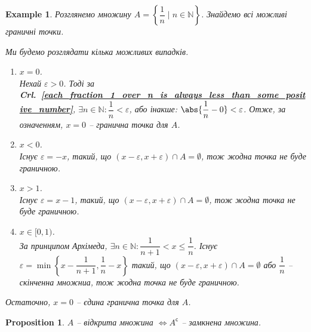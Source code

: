 \documentclass[a4paper, 14pt]{article}
\theoremstyle{theoremdd}
\theoremstyle{theoremdd}
\theoremstyle{theoremdd}
\theoremstyle{theoremdd}
\newtheorem{example}[theorem]{Example}
\theoremstyle{theoremdd}
\newtheorem{proposition}[theorem]{Proposition}
\theoremstyle{theoremdd}
\theoremstyle{theoremdd}
\theoremstyle{theoremdd}
\newcommand\crlref[1]{\textbf{Crl.~\ref{#1}}}
\begin{document}
\begin{example}
Розглянемо множину $A = \left\{ \dfrac{1}{n} \mid n \in \mathbb{N} \right\}$. Знайдемо всі можливі граничні точки.
\begin{figure}[H]
\centering
{}
\end{figure}
Ми будемо розглядати кілька можливих випадків.
\begin{enumerate}[wide=0pt,label={\Roman*.}]
\item $x = 0$.\\
Нехай $\varepsilon > 0$. Тоді за \crlref{each_fraction_1_over_n_is_always_less_than_some_positive_number}, $\exists n \in \mathbb{N}: \dfrac{1}{n} < \varepsilon$, або інакше: $\abs{\dfrac{1}{n}-0} < \varepsilon$. Отже, за означенням, $x = 0$ -- гранична точка для $A$.
\item $x < 0$.\\
Існує $\varepsilon = -x$, такий, що $(x-\varepsilon,x+\varepsilon) \cap A = \emptyset$, тож жодна точка не буде граничною.
\item $x > 1$.\\
Існує $\varepsilon = x-1$, такий, що $(x-\varepsilon,x+\varepsilon) \cap A = \emptyset$, тож жодна точка не буде граничною.
\item $x \in [0,1)$.\\
За принципом Архімеда, $\exists n \in \mathbb{N}: \dfrac{1}{n+1} < x \leq \dfrac{1}{n}$. Існує $\varepsilon = \min \left\{ x - \dfrac{1}{n+1}, \dfrac{1}{n} - x \right\}$ такий, що $(x-\varepsilon, x+\varepsilon) \cap A = \emptyset$ або $\dfrac{1}{n}$ -- скінченна множниа, тож жодна точка не буде граничною.
\end{enumerate}
Остаточно, $x = 0$ -- єдина гранична точка для $A$.
\end{example}

\begin{proposition}
\label{open_iff_complement_closed}
$A$ -- відкрита множина $\iff A^\mathsf{c}$ -- замкнена множина.
\end{proposition}
\end{document}
